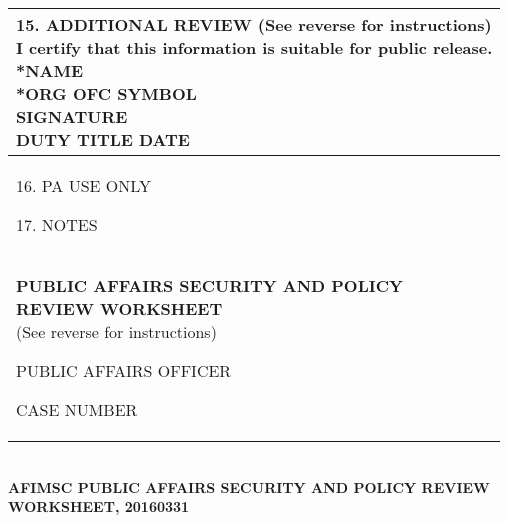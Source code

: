 \documentclass{article}
\begin{document}
{\begin{tabular}{|l|}
\parbox[][\rhXI][t]{.5\textwidth}{
\vspace{4pt}
\small 15. ADDITIONAL REVIEW (See reverse for instructions)\\[4pt]
\scriptsize I certify that this information is suitable for public release.\\[12pt]
*NAME \\[4pt]
*ORG \hspace{2.25pt}  \hspace{1.43pt} OFC SYMBOL \\[4pt]
SIGNATURE \\[4pt]
DUTY TITLE  \hspace{1.475pt} DATE 

}\\
\hline
\parbox[][\rhXII][t]{.15\textwidth}{
\vspace{4pt}
\small 16. PA USE ONLY\\[4pt]
}\vrule\hspace{1pt}

\parbox[][\rhXII][t]{.85\textwidth}{
\vspace{4pt}
\small 17. NOTES\\[4pt] 
}\\
\hline
\parbox[][\rhXIII][c]{0.59\textwidth}{
\centering
\textbf{PUBLIC AFFAIRS SECURITY AND POLICY}\\[1pt]
\textbf{REVIEW WORKSHEET}\\[1pt]
(See reverse for instructions)
} \vrule \hspace{1pt}

\parbox[][\rhXIII][t]{0.27\textwidth}{
\vspace{4pt}
\small PUBLIC AFFAIRS OFFICER\\[4pt]
}\vrule \hspace{1pt}

\parbox[][\rhXIII][t]{0.13\textwidth}{
\vspace{4pt}
\small CASE NUMBER\\[4pt]
}\\
\hline

\end{tabular}
}\\[2pt]
\textbf{AFIMSC PUBLIC AFFAIRS SECURITY AND POLICY REVIEW WORKSHEET, 20160331}
\end{document}
